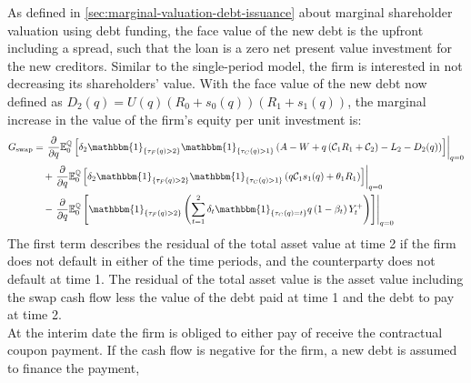 \documentclass[main.tex]{subfiles}
\begin{document}
        As defined in \cref{sec:marginal-valuation-debt-issuance} about marginal shareholder valuation using debt funding,
        the face value of the new debt is the upfront including a spread, such that the loan is a zero net present value investment for the new creditors.
        Similar to the single-period model, the firm is interested in not decreasing its shareholders' value.
        With the face value of the new debt now defined as $D_{2}(q) = U(q)(R_{0} + s_{0}(q))(R_{1} + s_{1}(q))$,
        the marginal increase in the value of the firm's equity per unit investment is:
        \begin{align}
            G_{\text{swap}} &=
            \left.\frac{\partial}{\partial q}
            \mathbb{E}_{0}^{\rnmeasure}\left[
                \delta_{2} \mathbbm{1}_{\{\tau_{F}(q)>2\}} \mathbbm{1}_{\{\tau_{C}(q)>1\}}
                \left(
                    A - W
                    + q\left(\mathcal{C}_{1} R_{1} + \mathcal{C}_{2}\right)
                    - L_{2}
                    - D_{2}(q)
                \right)
            \right]\right\rvert_{q=0}
            \nonumber
            \\
            &\quad+
            \left.\frac{\partial}{\partial q}
            \mathbb{E}_{0}^{\rnmeasure}\left[
                \delta_2 \mathbbm{1}_{\{\tau_{F}(q)>2\}} \mathbbm{1}_{\{\tau_{C}(q)>1\}}
                \left(q\mathcal{C}_{1} s_1(q) + \theta_{1}R_{1}\right)
            \right]\right\rvert_{q=0}
            \nonumber
            \\
            &\quad-
            \left.\frac{\partial}{\partial q}
            \mathbb{E}_{0}^{\rnmeasure}\left[
                \mathbbm{1}_{\{\tau_{F}(q)>2\}}
                \left(
                    \sum_{t=1}^{2} \delta_{t} \mathbbm{1}_{\{\tau_{C}(q)=t\}}q\left(1-\beta_t\right)Y_{t}^{+}
                \right)
            \right]\right\rvert_{q=0}
        \end{align}
        The first term describes the residual of the total asset value at time 2 if the firm does not default in either of the time periods, and the counterparty does not default at time 1.
        The residual of the total asset value is the asset value including the swap cash flow less the value of the debt paid at time 1 and the debt to pay at time 2.
        \\
        At the interim date the firm is obliged to either pay of receive the contractual coupon payment.
        If the cash flow is negative for the firm, a new debt is assumed to finance the payment,
\end{document}
